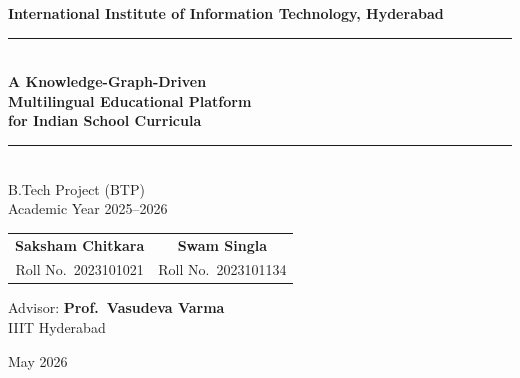 \documentclass[12pt,a4paper]{article}
\begin{document}
\thispagestyle{empty}

\begin{center}
\vspace*{1.2cm}
{\large\bfseries International Institute of Information Technology, Hyderabad}\\[1.4cm]

{\color{mainblue}\rule{\linewidth}{1.8pt}}\\[0.8cm]

{\LARGE\bfseries A Knowledge-Graph-Driven\\[0.45cm]
Multilingual Educational Platform\\[0.45cm]
for Indian School Curricula}\\[0.8cm]

{\color{mainblue}\rule{\linewidth}{1.8pt}}\\[2.2cm]

{\large B.Tech Project (BTP)}\\[0.35cm]
{\large Academic Year 2025--2026}\\[2.6cm]

\renewcommand{\arraystretch}{1.9}
\begin{tabular}{c@{\qquad\qquad\quad}c}
  \textbf{\large Saksham Chitkara} & \textbf{\large Swam Singla} \\
  {\normalsize Roll No.\ 2023101021} & {\normalsize Roll No.\ 2023101134}
\end{tabular}

\vspace{1.2cm}
{\normalsize Advisor: \textbf{Prof.\ Vasudeva Varma}}\\[0.3cm]
{\normalsize IIIT Hyderabad}

\vfill
{\large May 2026}
\end{center}

\newpage
\thispagestyle{plain}
\end{document}

